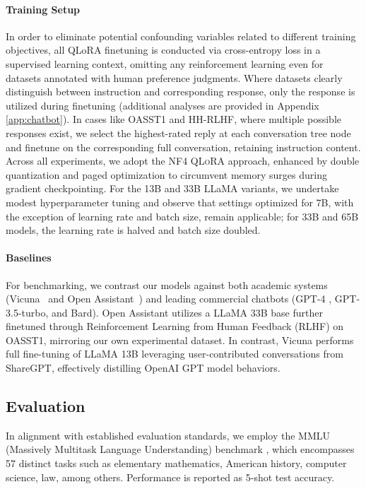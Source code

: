 \paragraph{Training Setup} In order to eliminate potential confounding variables related to different training objectives, all QLoRA finetuning is conducted via cross-entropy loss in a supervised learning context, omitting any reinforcement learning even for datasets annotated with human preference judgments. Where datasets clearly distinguish between instruction and corresponding response, only the response is utilized during finetuning (additional analyses are provided in Appendix \ref{app:chatbot}). In cases like OASST1 and HH-RLHF, where multiple possible responses exist, we select the highest-rated reply at each conversation tree node and finetune on the corresponding full conversation, retaining instruction content. Across all experiments, we adopt the NF4 \textsc{QLoRA} approach, enhanced by double quantization and paged optimization to circumvent memory surges during gradient checkpointing. For the 13B and 33B LLaMA variants, we undertake modest hyperparameter tuning and observe that settings optimized for 7B, with the exception of learning rate and batch size, remain applicable; for 33B and 65B models, the learning rate is halved and batch size doubled.

\paragraph{Baselines} For benchmarking, we contrast our models against both academic systems (Vicuna~\citep{vicuna2023} and Open Assistant~\citep{kopf2023openassistant}) and leading commercial chatbots (GPT-4 \citep{openai2023gpt}, GPT-3.5-turbo, and Bard). Open Assistant utilizes a LLaMA 33B base further finetuned through Reinforcement Learning from Human Feedback (RLHF) on OASST1, mirroring our own experimental dataset. In contrast, Vicuna performs full fine-tuning of LLaMA 13B leveraging user-contributed conversations from ShareGPT, effectively distilling OpenAI GPT model behaviors.

\subsection{Evaluation}

In alignment with established evaluation standards, we employ the MMLU (Massively Multitask Language Understanding) benchmark \citep{hendrycksmeasuring}, which encompasses 57 distinct tasks such as elementary mathematics, American history, computer science, law, among others. Performance is reported as 5-shot test accuracy.

